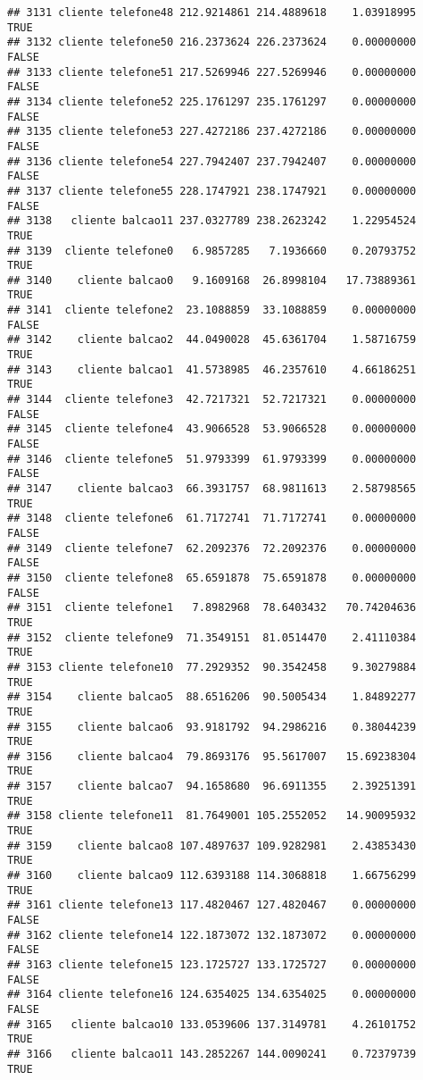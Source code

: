 \documentclass[
]{article}
\begin{document}
\begin{verbatim}
## 3131 cliente telefone48 212.9214861 214.4889618    1.03918995     TRUE
## 3132 cliente telefone50 216.2373624 226.2373624    0.00000000    FALSE
## 3133 cliente telefone51 217.5269946 227.5269946    0.00000000    FALSE
## 3134 cliente telefone52 225.1761297 235.1761297    0.00000000    FALSE
## 3135 cliente telefone53 227.4272186 237.4272186    0.00000000    FALSE
## 3136 cliente telefone54 227.7942407 237.7942407    0.00000000    FALSE
## 3137 cliente telefone55 228.1747921 238.1747921    0.00000000    FALSE
## 3138   cliente balcao11 237.0327789 238.2623242    1.22954524     TRUE
## 3139  cliente telefone0   6.9857285   7.1936660    0.20793752     TRUE
## 3140    cliente balcao0   9.1609168  26.8998104   17.73889361     TRUE
## 3141  cliente telefone2  23.1088859  33.1088859    0.00000000    FALSE
## 3142    cliente balcao2  44.0490028  45.6361704    1.58716759     TRUE
## 3143    cliente balcao1  41.5738985  46.2357610    4.66186251     TRUE
## 3144  cliente telefone3  42.7217321  52.7217321    0.00000000    FALSE
## 3145  cliente telefone4  43.9066528  53.9066528    0.00000000    FALSE
## 3146  cliente telefone5  51.9793399  61.9793399    0.00000000    FALSE
## 3147    cliente balcao3  66.3931757  68.9811613    2.58798565     TRUE
## 3148  cliente telefone6  61.7172741  71.7172741    0.00000000    FALSE
## 3149  cliente telefone7  62.2092376  72.2092376    0.00000000    FALSE
## 3150  cliente telefone8  65.6591878  75.6591878    0.00000000    FALSE
## 3151  cliente telefone1   7.8982968  78.6403432   70.74204636     TRUE
## 3152  cliente telefone9  71.3549151  81.0514470    2.41110384     TRUE
## 3153 cliente telefone10  77.2929352  90.3542458    9.30279884     TRUE
## 3154    cliente balcao5  88.6516206  90.5005434    1.84892277     TRUE
## 3155    cliente balcao6  93.9181792  94.2986216    0.38044239     TRUE
## 3156    cliente balcao4  79.8693176  95.5617007   15.69238304     TRUE
## 3157    cliente balcao7  94.1658680  96.6911355    2.39251391     TRUE
## 3158 cliente telefone11  81.7649001 105.2552052   14.90095932     TRUE
## 3159    cliente balcao8 107.4897637 109.9282981    2.43853430     TRUE
## 3160    cliente balcao9 112.6393188 114.3068818    1.66756299     TRUE
## 3161 cliente telefone13 117.4820467 127.4820467    0.00000000    FALSE
## 3162 cliente telefone14 122.1873072 132.1873072    0.00000000    FALSE
## 3163 cliente telefone15 123.1725727 133.1725727    0.00000000    FALSE
## 3164 cliente telefone16 124.6354025 134.6354025    0.00000000    FALSE
## 3165   cliente balcao10 133.0539606 137.3149781    4.26101752     TRUE
## 3166   cliente balcao11 143.2852267 144.0090241    0.72379739     TRUE

\end{verbatim}
\end{document}
